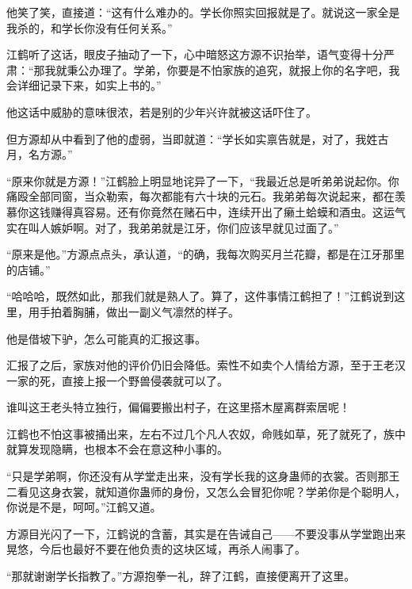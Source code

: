 \begin{this_body}
他笑了笑，直接道：“这有什么难办的。学长你照实回报就是了。就说这一家全是我杀的，和学长你没有任何关系。”

江鹤听了这话，眼皮子抽动了一下，心中暗怒这方源不识抬举，语气变得十分严肃：“那我就秉公办理了。学弟，你要是不怕家族的追究，就报上你的名字吧，我会详细记录下来，如实上书的。”

他这话中威胁的意味很浓，若是别的少年兴许就被这话吓住了。

但方源却从中看到了他的虚弱，当即就道：“学长如实禀告就是，对了，我姓古月，名方源。”

“原来你就是方源！”江鹤脸上明显地诧异了一下，“我最近总是听弟弟说起你。你痛殴全部同窗，当众勒索，每次都能有六十块的元石。我弟弟每次说起来，都在羡慕你这钱赚得真容易。还有你竟然在赌石中，连续开出了癞土蛤蟆和酒虫。这运气实在叫人嫉妒啊。对了，我弟弟就是江牙，你们应该早就见过面了。”

“原来是他。”方源点点头，承认道，“的确，我每次购买月兰花瓣，都是在江牙那里的店铺。”

“哈哈哈，既然如此，那我们就是熟人了。算了，这件事情江鹤担了！”江鹤说到这里，用手拍着胸脯，做出一副义气凛然的样子。

他是借坡下驴，怎么可能真的汇报这事。

汇报了之后，家族对他的评价仍旧会降低。索性不如卖个人情给方源，至于王老汉一家的死，直接上报一个野兽侵袭就可以了。

谁叫这王老头特立独行，偏偏要搬出村子，在这里搭木屋离群索居呢！

江鹤也不怕这事被捅出来，左右不过几个凡人农奴，命贱如草，死了就死了，族中就算发现隐瞒，也根本不会在意这种小事的。

“只是学弟啊，你还没有从学堂走出来，没有学长我的这身蛊师的衣裳。否则那王二看见这身衣裳，就知道你蛊师的身份，又怎么会冒犯你呢？学弟你是个聪明人，你说是不是，呵呵。”江鹤又道。

方源目光闪了一下，江鹤说的含蓄，其实是在告诫自己——不要没事从学堂跑出来晃悠，今后也最好不要在他负责的这块区域，再杀人闹事了。

“那就谢谢学长指教了。”方源抱拳一礼，辞了江鹤，直接便离开了这里。

\end{this_body}

